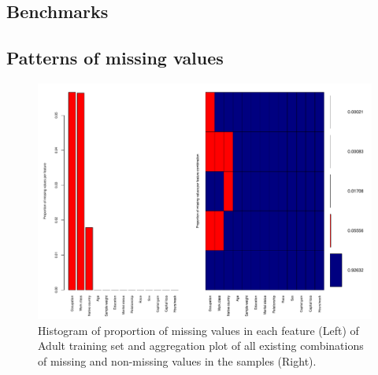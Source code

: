\documentclass[12pt]{article}
\begin{document}
\subsection{Benchmarks}

\subsection{Patterns of missing values}


\begin{figure}[htbp] 
   \centering
   \includegraphics[scale=0.6]{proportion-missing.pdf} 
   \caption{Histogram of proportion of missing values in each feature (Left) of Adult training set and aggregation plot of all existing combinations of missing and non-missing values in the samples (Right).}
   \label{proportion-missing}
\end{figure}
\end{document}
